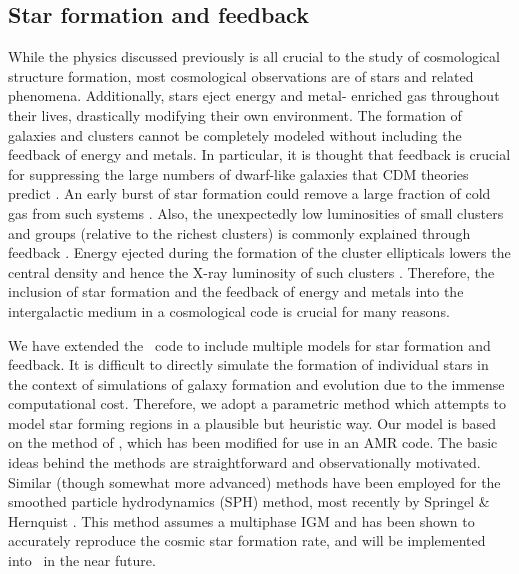 \subsection{Star formation and feedback}
\label{sec.ov.star}


While the physics discussed previously is all crucial to the study of
cosmological structure formation, most cosmological observations are of
stars and related phenomena.  Additionally, stars eject energy and metal-
enriched gas throughout their lives, drastically modifying their own 
environment.  The formation of galaxies and clusters cannot be completely
modeled without including the feedback of energy and metals.  In particular,
it is thought that feedback is crucial for suppressing the large numbers of
dwarf-like galaxies that CDM theories predict 
\citep{1991ApJ...381...14L,1991ApJ...379...52W}.  An early
burst of star formation could remove a large fraction of cold gas from such systems
\citep{1978MNRAS.183..341W,1991ApJ...367...45C}.  Also, the unexpectedly 
low luminosities of small clusters and
groups (relative to the richest clusters) is commonly explained through feedback
\citep{1991ApJ...383..104K}.  Energy ejected during the formation of the cluster ellipticals 
lowers the central density and hence the X-ray luminosity of such clusters 
 \citep{1997ApJ...484L..21C}.  Therefore, the inclusion of star formation and the 
feedback of energy and metals into the intergalactic medium in a cosmological
code is crucial for many reasons.  

We have extended the \enzo\ code to include multiple models for star formation
and feedback.  It is difficult to directly simulate the formation of individual
stars in the context of simulations of galaxy formation and evolution due
to the immense computational cost.  Therefore, we adopt a parametric method which attempts
to model star forming regions in a plausible but heuristic way.  
Our model is based on the method of  \citet{CO1992}, which 
has been modified for use in an AMR code.  The basic
ideas behind the methods are straightforward and observationally motivated.
Similar (though somewhat more advanced) methods have been employed for the 
smoothed particle hydrodynamics
(SPH) method, most recently by Springel \& Hernquist 
\citep{sh03a,sh03b,hs03}. This 
method assumes a multiphase IGM and has been shown to accurately reproduce the cosmic star
formation rate, and will be implemented into \enzo\ in the near future.

